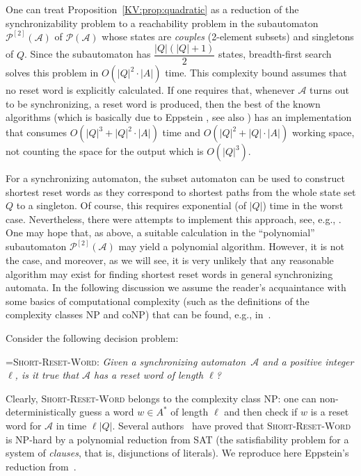 \documentclass{irmaart}
\newcommand{\sa}{synchronizing au\-tom\-a\-ta}
\newcommand{\san}{synchronizing au\-tom\-a\-ton}
\theoremstyle{plain}
\begin{document}
One can treat Proposition~\ref{KV:prop:quadratic} as a reduction of the
synchronizability problem to a reachability problem in the subautomaton
$\mathcal{P}^{[2]}(\mathcal{A})$ of $\mathcal{P}(\mathcal{A})$ whose states are
\emph{couples} (2-element subsets) and singletons of $Q$. Since
the subautomaton has $\dfrac{|Q|(|Q|+1)}2$ states, breadth-first search solves
this problem in $O(|Q|^2\cdot|A|)$ time. This complexity bound assumes that no
reset word is explicitly calculated. If one requires that, whenever
$\mathcal{A}$ turns out to be synchronizing, a reset word is produced, then the
best of the known algorithms (which is basically due to Eppstein
\cite[Theorem~6]{Eppstein:1990}, see also \cite[Theorem~1.15]{Sandberg:2005})
has an implementation that consumes $O(|Q|^3 + |Q|^2\cdot|A|)$ time and
$O(|Q|^2 + |Q|\cdot|A|)$ working space, not counting the space for the output
which is $O(|Q|^3)$.

For a \san, the subset automaton can be used to construct shortest reset words
as they correspond to shortest paths from the whole state set $Q$ to a
singleton. Of course, this requires exponential (of $|Q|$) time in the worst
case. Nevertheless, there were attempts to implement this approach, see, e.g.,
\cite{Rho&Somenzi&Pixley:1993,Trahtman:2006}. One may hope that, as above, a
suitable calculation in the ``polynomial'' subautomaton
$\mathcal{P}^{[2]}(\mathcal{A})$ may yield a polynomial algorithm. However, it
is not the case, and moreover, as we will see, it is very unlikely that any
reasonable algorithm may exist for finding shortest reset words in general \sa.
In the following discussion we assume the reader's acquaintance with some
basics of computational complexity (such as the definitions of the complexity
classes \textsf{NP} and \textsf{coNP}) that can be found, e.g.,
in~\cite{Garey&Johnson:1979,Papadimitriou:1994}.

Consider the following decision problem:

\smallskip

\hangindent=\parindent \noindent\textsc{Short-Reset-Word:}
\emph{Given a \san\ $\mathcal{A}$ and a positive integer $\ell$,
is it true that $\mathcal{A}$ has a reset word of length $\ell$?}

\smallskip

Clearly, \textsc{Short-Reset-Word} belongs to the complexity class
\textsf{NP}: one can non-deterministically guess a word $w\in A^*$
of length $\ell$ and then check if $w$ is a reset word for
$\mathcal{A}$ in time $\ell|Q|$. Several
authors~\cite{Rystsov:1980,Eppstein:1990,Goralcik&Koubek:1995,Salomaa:2003,Samotij:2007}
have proved that \textsc{Short-Reset-Word} is \textsf{NP}-hard by
a polynomial reduction from \textsc{SAT} (the satisfiability
problem for a system of \emph{clauses}, that is, disjunctions of
literals). We reproduce here Eppstein's reduction
from~\cite{Eppstein:1990}.
\end{document}
